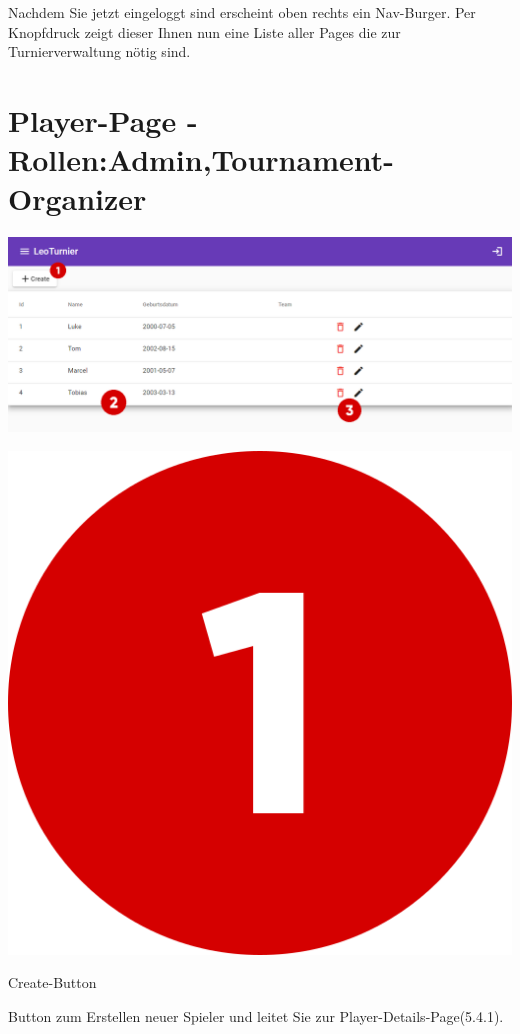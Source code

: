Nachdem Sie jetzt eingeloggt sind erscheint oben rechts ein Nav-Burger. Per Knopfdruck zeigt dieser Ihnen nun eine Liste aller Pages die zur
Turnierverwaltung nötig sind.

\newpage
\section{Player-Page - Rollen:Admin,Tournament-Organizer}
\includegraphics[scale=0.425]{pics/user-guide/player-overview-page.PNG}
\bigskip

\includegraphics[scale=0.05]{pics/user-guide/numbers/number-1.png} \begin{LARGE} Create-Button \end{LARGE}

Button zum Erstellen neuer Spieler und leitet Sie zur Player-Details-Page(5.4.1).


